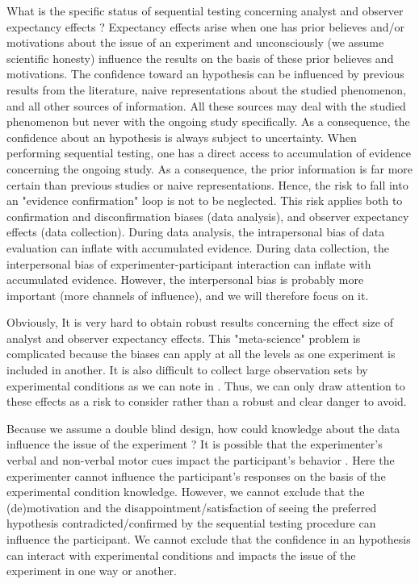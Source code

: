 \documentclass[a4paper,man,natbib,floatsintext,donotrepeattitle]{apa6}
\begin{document}
What is the specific status of sequential testing concerning analyst and observer expectancy effects ? Expectancy effects arise when one has prior believes and/or motivations about the issue of an experiment and unconsciously (we assume scientific honesty) influence the results on the basis of these prior believes and motivations. The confidence toward an hypothesis can be influenced by previous results from the literature, naive representations about the studied phenomenon, and all other sources of information. All these sources may deal with the studied phenomenon but never with the ongoing study specifically. As a consequence, the confidence about an hypothesis is always subject to uncertainty. When performing sequential testing, one has a direct access to accumulation of evidence concerning the ongoing study. As a consequence, the prior information is far more certain than previous studies or naive representations. Hence, the risk to fall into an "evidence confirmation" loop is not to be neglected. This risk applies both to confirmation and disconfirmation biases (data analysis), and observer expectancy effects (data collection). During data analysis, the intrapersonal bias of data evaluation can inflate with accumulated evidence. During data collection, the interpersonal bias of experimenter-participant interaction can inflate with accumulated evidence. However, the interpersonal bias is probably more important (more channels of influence), and we will therefore focus on it. \par


Obviously, It is very hard to obtain robust results concerning the effect size of analyst and observer expectancy effects. This "meta-science" problem is complicated because the biases can apply at all the levels as one experiment is included in another. It is also difficult to collect large observation sets by experimental conditions as we can note in \cite{zoble_interaction_1969}. Thus, we can only draw attention to these effects as a risk to consider rather than a robust and clear danger to avoid. \par

Because we assume a double blind design, how could knowledge about the data influence the issue of the experiment ? It is possible that the experimenter's verbal and non-verbal motor cues impact the participant's behavior \citep{zoble_interaction_1969}. Here the experimenter cannot influence the participant's responses on the basis of the experimental condition knowledge. However, we cannot exclude that the (de)motivation and the disappointment/satisfaction of seeing the preferred hypothesis contradicted/confirmed by the sequential testing procedure can influence the participant. We cannot exclude that the confidence in an hypothesis can interact with experimental conditions and impacts the issue of the experiment in one way or another.\par
\end{document}
